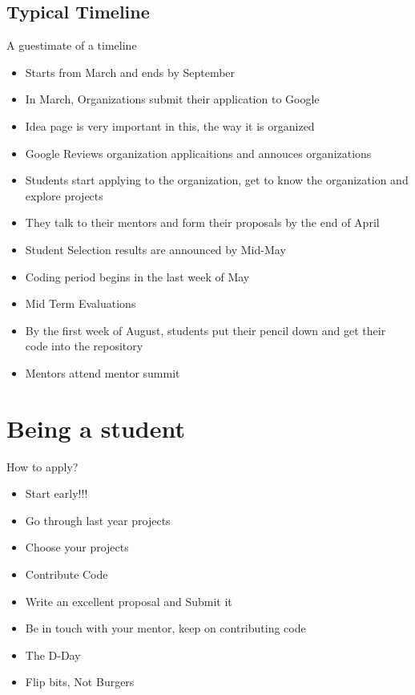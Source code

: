 \documentclass{beamer}
\begin{document}
\subsection{Typical Timeline}
\begin{frame}{A guestimate of a timeline}
\begin{itemize}
\pause
\item Starts from March and ends by September \pause
\item In March, Organizations submit their application to Google \pause
\item Idea page is very important in this, the way it is organized \pause
\item Google Reviews organization applicaitions and annouces organizations \pause
\item Students start applying to the organization, get to know the organization and explore projects \pause
\item They talk to their mentors and form their proposals by the end of April \pause
\item Student Selection results are announced by Mid-May \pause
\item Coding period begins in the last week of May \pause
\item Mid Term Evaluations \pause
\item By the first week of August, students put their pencil down and get their code into the repository \pause
\item Mentors attend mentor summit
\end{itemize}
\end{frame}

\section{Being a student}
\begin{frame}{How to apply?}
\begin{itemize}
\item Start early!!! \pause
\item Go through last year projects \pause
\item Choose your projects \pause
\item Contribute Code \pause
\item Write an excellent proposal and Submit it \pause
\item Be in touch with your mentor, keep on contributing code \pause
\item The D-Day \pause
\item Flip bits, Not Burgers 
\end{itemize}
\end{frame}
\end{document}
